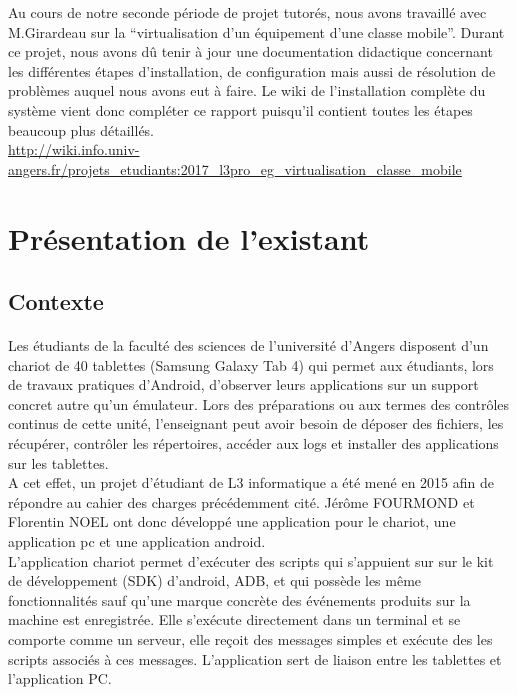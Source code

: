 \documentclass[a4paper,12pt]{extarticle}
\begin{document}
Au cours de notre seconde période de projet tutorés, nous avons travaillé avec M.Girardeau sur la “virtualisation d’un équipement d’une classe mobile”. Durant ce projet, nous avons dû tenir à jour une documentation didactique concernant les différentes étapes d’installation, de configuration mais aussi de résolution de problèmes auquel nous avons eut à faire.\newline
Le wiki de l’installation complète du système vient donc compléter ce rapport puisqu’il contient toutes les étapes beaucoup plus détaillés.\\

\url{http://wiki.info.univ-angers.fr/projets_etudiants:2017_l3pro_eg_virtualisation_classe_mobile}

\clearpage

\section{Présentation de l'existant}

\subsection{Contexte}
\paragraph{}
Les étudiants de la faculté des sciences de l’université d’Angers disposent d’un chariot de 40 tablettes (Samsung Galaxy Tab 4) qui permet aux étudiants, lors de travaux pratiques d’Android, d’observer leurs applications sur un support concret autre qu’un émulateur.
Lors des préparations ou aux termes des contrôles continus de cette unité, l’enseignant peut avoir besoin de déposer des fichiers, les récupérer, contrôler les répertoires, accéder aux logs et installer des applications sur les tablettes.\\

A cet effet, un projet d’étudiant de L3 informatique a été mené en 2015 afin de répondre au cahier des charges précédemment cité. Jérôme FOURMOND et Florentin NOEL ont donc développé une application pour le chariot, une application pc et une application android.\\

L’application chariot permet d’exécuter des scripts qui s’appuient sur sur le kit de développement (SDK) d’android, ADB, et qui possède les même fonctionnalités sauf qu’une marque concrète des événements produits sur la machine est enregistrée.  Elle s'exécute directement dans un terminal et  se comporte comme un serveur, elle reçoit des messages simples et exécute des les scripts associés à ces messages. L’application sert de liaison entre les tablettes et l’application PC.\\
\end{document}
